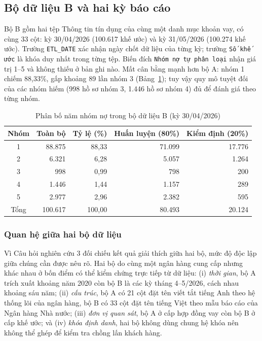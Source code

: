 \subsection{Bộ dữ liệu B và hai kỳ báo cáo}
\label{sec:dataset-b-structure}

Bộ B gồm hai tệp Thông tin tín dụng của cùng một danh mục khoản vay, có cùng 33 cột: kỳ 30/04/2026 (100.617 khế ước) và kỳ 31/05/2026 (100.274 khế ước). Trường \mbox{\texttt{ETL\_DATE}} xác nhận ngày chốt dữ liệu của từng kỳ; trường \texttt{Số khế ước} là khóa duy nhất trong từng tệp. Biến đích \texttt{Nhóm nợ tự phân loại} nhận giá trị 1--5 và không thiếu ở bản ghi nào. Mất cân bằng mạnh hơn bộ A: nhóm 1 chiếm 88,33\%, gấp khoảng 89 lần nhóm 3 (Bảng~\ref{tab:split-distribution}); tuy vậy quy mô tuyệt đối của các nhóm hiếm (998 hồ sơ nhóm 3, 1.446 hồ sơ nhóm 4) đủ để đánh giá theo từng nhóm.

\begin{table}[H]
\centering
\caption{Phân bố năm nhóm nợ trong bộ dữ liệu B (kỳ 30/04/2026)}
\label{tab:split-distribution}
\begin{tabular}{|c|r|r|r|r|}
\hline
Nhóm & Toàn bộ & Tỷ lệ (\%) & Huấn luyện (80\%) & Kiểm định (20\%)\\
\hline
1 & 88.875 & 88,33 & 71.099 & 17.776\\
2 & 6.321 & 6,28 & 5.057 & 1.264\\
3 & 998 & 0,99 & 798 & 200\\
4 & 1.446 & 1,44 & 1.157 & 289\\
5 & 2.977 & 2,96 & 2.382 & 595\\
\hline
Tổng & 100.617 & 100,00 & 80.493 & 20.124\\
\hline
\end{tabular}
\end{table}

\subsubsection*{Quan hệ giữa hai bộ dữ liệu}
\label{sec:ab-relation}

Vì Câu hỏi nghiên cứu 3 đối chiếu kết quả giải thích giữa hai bộ, mức độ độc lập giữa chúng cần được nêu rõ. Hai bộ do cùng một ngân hàng cung cấp nhưng khác nhau ở bốn điểm có thể kiểm chứng trực tiếp từ dữ liệu: (i) \emph{thời gian}, bộ A trích xuất khoảng năm 2020 còn bộ B là các kỳ tháng 4--5/2026, cách nhau khoảng sáu năm; (ii) \emph{cấu trúc}, bộ A có 21 cột đặt tên viết tắt tiếng Anh theo hệ thống lõi của ngân hàng, bộ B có 33 cột đặt tên tiếng Việt theo mẫu báo cáo của Ngân hàng Nhà nước; (iii) \emph{đơn vị quan sát}, bộ A ở cấp hợp đồng vay còn bộ B ở cấp khế ước; và (iv) \emph{khóa định danh}, hai bộ không dùng chung hệ khóa nên không thể ghép để kiểm tra chồng lấn khách hàng.

